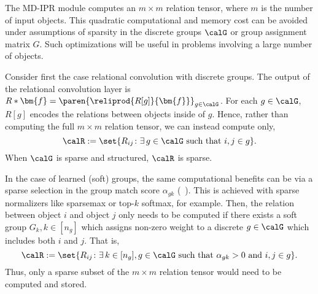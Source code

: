 The MD-IPR module computes an $m \times m$ relation tensor, where $m$ is the number of input objects. This quadratic computational and memory cost can be avoided under assumptions of sparsity in the discrete groups $\calG$ or group assignment matrix $G$. Such optimizations will be useful in problems involving a large number of objects.

Consider first the case relational convolution with discrete groups. The output of the relational convolution layer is $R \ast \bm{f} = \paren{\reliprod{R[g]}{\bm{f}}}_{g \in \calG}$. For each $g \in \calG$, $R[g]$ encodes the relations between objects inside of $g$. Hence, rather than computing the full $m \times m$ relation tensor, we can instead compute only,
\begin{equation*}
    \calR := \set{R_{ij} \colon \exists\, g \in \calG \text{ such that } i,j \in g}.
\end{equation*}
When $\calG$ is sparse and structured, $\calR$ is sparse.

In the case of learned (soft) groups, the same computational benefits can be via a sparse selection in the group match score $\alpha_{gk}$ (~). This is achieved with sparse normalizers like sparsemax or top-$k$ softmax, for example. Then, the relation between object $i$ and object $j$ only needs to be computed if there exists a soft group $G_k, k \in [n_g]$ which assigns non-zero weight to a discrete $g \in \calG$ which includes both $i$ and $j$. That is,
\begin{equation*}
    \calR := \set{R_{ij} \colon \exists\, k \in [n_g], g \in \calG \text{ such that } \alpha_{gk} > 0 \text{ and } i,j \in g}.
\end{equation*}
Thus, only a sparse subset of the $m \times m$ relation tensor would need to be computed and stored.